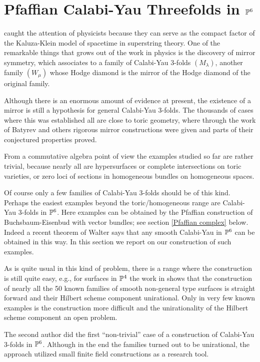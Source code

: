 \section{Pfaffian Calabi-Yau Threefolds in ${\mathbb P}^6$}

 caught the attention of physicists
because they can serve as the compact factor of the
Kaluza-Klein model of spacetime
in superstring theory.
One of the remarkable things that grows out of the work in physics
is the discovery of mirror symmetry, which associates to a family of
Calabi-Yau 3-folds $(M_\lambda)$, another family $(W_\mu)$ whose Hodge
diamond is the mirror of the Hodge diamond of the original family.

Although there is an enormous amount of evidence at present, the existence 
of a mirror is still a hypothesis for general Calabi-Yau 3-folds. 
The thousands of cases where this was established all are close to toric
geometry, where through the work of Batyrev and others \cite{CO:Ba,CO:CK} 
rigorous mirror
constructions were given and parts of their conjectured properties proved.


\medskip
From a commutative algebra point of view the examples studied so far are 
rather trivial, because nearly all are hypersurfaces or complete 
intersections on toric varieties, or zero loci of sections in 
homogeneous bundles on homogeneous spaces.  

Of course only a few families of Calabi-Yau 3-folds should be of this kind.
Perhaps the easiest examples beyond the toric/homogeneous range are 
Ca\-la\-bi-Yau 3-folds in ${\mathbb P}^6$. 
Here examples can be obtained by the Pfaffian
construction of Buchsbaum-Eisenbud \cite{CO:BE} with vector bundles; see 
section \ref{Pfaffian complex} below. 
Indeed a recent theorem of Walter \cite{CO:Wa} says 
that any smooth Calabi-Yau in ${\mathbb P}^6$ can be obtained in this way. 
In this section we report on our construction of such examples. 

As is quite usual in this kind of problem, there is a range where the
construction is still quite easy, 
e.g., for surfaces in ${\mathbb P}^4$ the work in \cite{CO:DES,CO:Po} 
shows that the construction of nearly all the 50 known families 
of smooth non-general type surfaces is straight forward 
and their Hilbert scheme component unirational. 
Only in very few known examples is the construction more difficult
and the unirationality of the Hilbert scheme component an open problem.

The second author did the first ``non-trivial'' case of a construction of 
Calabi-Yau 3-folds in ${\mathbb P}^6$. 
Although in the end the families  turned out to be unirational, 
the approach utilized small finite field constructions as a research tool.




